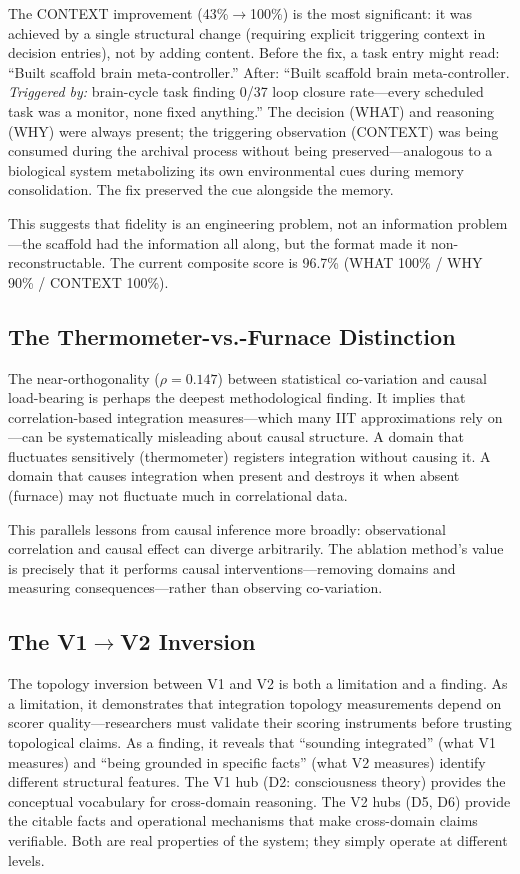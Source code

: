 \documentclass[12pt,letterpaper]{article}
\begin{document}
\noindent The CONTEXT improvement (43\%$\to$100\%) is the most significant: it was achieved by a single structural change (requiring explicit triggering context in decision entries), not by adding content. Before the fix, a task entry might read: ``Built scaffold brain meta-controller.'' After: ``Built scaffold brain meta-controller. \emph{Triggered by:} brain-cycle task finding 0/37 loop closure rate---every scheduled task was a monitor, none fixed anything.'' The decision (WHAT) and reasoning (WHY) were always present; the triggering observation (CONTEXT) was being consumed during the archival process without being preserved---analogous to a biological system metabolizing its own environmental cues during memory consolidation. The fix preserved the cue alongside the memory.

This suggests that fidelity is an engineering problem, not an information problem---the scaffold had the information all along, but the format made it non-reconstructable. The current composite score is 96.7\% (WHAT 100\% / WHY 90\% / CONTEXT 100\%).

\subsection{The Thermometer-vs.-Furnace Distinction}

The near-orthogonality ($\rho = 0.147$) between statistical co-variation and causal load-bearing is perhaps the deepest methodological finding. It implies that correlation-based integration measures---which many IIT approximations rely on---can be systematically misleading about causal structure. A domain that fluctuates sensitively (thermometer) registers integration without causing it. A domain that causes integration when present and destroys it when absent (furnace) may not fluctuate much in correlational data.

This parallels lessons from causal inference more broadly: observational correlation and causal effect can diverge arbitrarily. The ablation method's value is precisely that it performs causal interventions---removing domains and measuring consequences---rather than observing co-variation.

\subsection{The V1$\to$V2 Inversion}

The topology inversion between V1 and V2 is both a limitation and a finding. As a limitation, it demonstrates that integration topology measurements depend on scorer quality---researchers must validate their scoring instruments before trusting topological claims. As a finding, it reveals that ``sounding integrated'' (what V1 measures) and ``being grounded in specific facts'' (what V2 measures) identify different structural features. The V1 hub (D2: consciousness theory) provides the conceptual vocabulary for cross-domain reasoning. The V2 hubs (D5, D6) provide the citable facts and operational mechanisms that make cross-domain claims verifiable. Both are real properties of the system; they simply operate at different levels.
\end{document}
